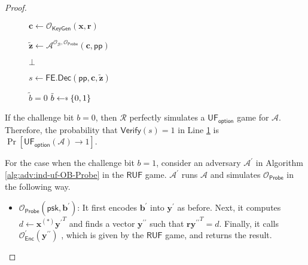 \begin{proof}
\begin{figure}[h]
\begin{minipage}[t]{0.6\linewidth}
\begin{algorithm}[H]
\begin{algorithmic}[1]
		\State $\mathbf{c} \gets \mathcal{O}_{\textsf{KeyGen}}(\mathbf{x}, \mathbf{r})$

		\State ${\mathbf{\tilde{z}}} \gets \mathcal{A}^{\mathcal{O}_{\mathcal{B}}, \mathcal{O}_{\textsf{Probe}} } ( \mathbf{c}, \textsf{pp})$


			\State \Return $\bot$

		\EndIf

		\State $s \gets \textsf{FE.Dec}( \textsf{pp}, \mathbf{c}, \mathbf{\tilde{z}} )$

		 \label{alg:red:ind-uf-OB-Probe:verify}
			\State \Return $\tilde{b} = 0$
		\Else
			\State \Return $\tilde{b} \getsdollar \{0, 1\}$
		\EndIf

	\end{algorithmic}
	\end{algorithm}
	\end{minipage}
	
\end{figure}

If the challenge bit $b = 0$, then $\mathcal{R}$ perfectly simulates a $\textsf{UF}_\textsf{option}$ game for $\mathcal{A}$. Therefore, the probability that $\textsf{Verify}(s) = 1$ in Line \ref{alg:red:ind-uf-OB-Probe:verify} is $\Pr[\textsf{UF}_\textsf{option}(\mathcal{A}) \to 1]$.

For the case when the challenge bit $b = 1$, consider an adversary $\mathcal{A}^\prime$ in Algorithm \ref{alg:adv:ind-uf-OB-Probe} in the $\textsf{RUF}$ game. $\mathcal{A}^\prime$ runs $\mathcal{A}$ and simulates $\mathcal{O}_{\textsf{Probe}}$ in the following way.

\begin{itemize}

	\item $\mathcal{O}_{\textsf{Probe}}( \textsf{psk}, \mathbf{b}^\prime )$: It first encodes $\mathbf{b}^\prime$ into $\mathbf{y}^\prime$ as before. Next, it computes $d \gets \mathbf{x}^{(*)}{\mathbf{y}^\prime}^T$ and finds a vector $\mathbf{y}^{\prime\prime}$ such that $\mathbf{r}{\mathbf{y}^{\prime\prime}}^T = d$. Finally, it calls $\mathcal{O}^\prime_{\textsf{Enc}} (\mathbf{y}^{\prime\prime} )$ , which is given by the $\textsf{RUF}$ game, and returns the result.

\end{itemize}

\begin{figure}[h]
\centering
	

\end{figure}
\end{proof}

